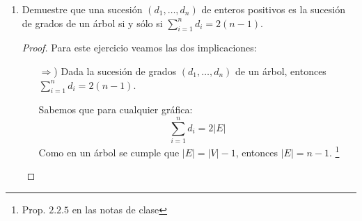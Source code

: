 \documentclass{article}
\begin{document}
\begin{enumerate}
      \begin{proof} Demostración por inducción sobre m

        Paso base (m=1)

        Por definición de hidrocarburo saturado $C_1 k_4 \Longrightarrow$  4 = 2(1)+2 por lo tanto para m=1 se cumple que n=2m+2

        Hipótesis de inducción m = k, si  $C_k H_n \Longrightarrow$ supongamos n=2k+2

        Paso Inductivo

        Pd m=k+1

        Por hipótesis de inducción tenemos que $C_k H_n \Longrightarrow$ n=2k+2 y por paso base $c_1 K_4 \Longrightarrow$ 4=2(1)+2 $\Longrightarrow$ sean r que pertenece a los Naturales sin el 0, sea $C_r$ y $C_1$ donde  $C_r$ pertenece a $C_k H_n$  y $C_1$ pertenece a $C_1 k_4$ tal que r pertenece a ${1,2,3,...,k}$  $\Longrightarrow$  eliminemos 1 hidrógeno a $C_r$ y $C_1 \Longrightarrow C_k H_{n-1}$ y $C_1 k_3$ son iguales a n-1=2k+1 ...(1) y 3=2(1)+1 ...(2) $\Longrightarrow$ uniendo $C_k H_{n-1}$ y $C_1 k_3$ mediante los vertices $C_r$ y $C_1$ $\Longrightarrow C_{k+1} H_{m}$ seria igual a la suma de (1) y (2) $\Longrightarrow$ n+2 = 2(k) + 2(1) +2 $\Longrightarrow$  n+2 = 2(k+1)+2
        $\Longrightarrow$ m=n+1 $\Longrightarrow$  n+2 = 2(k+1)+2. Por lo tanto para $C_{k+1} H_{m}$ m=2(k+1)+2

        Por lo tanto,  para todo m que pertenece a Naturales sin el cero $C_m H_n$ tal que n=2m+2


      \end{proof}

    \item Demuestre que una sucesi\'on $(d_1, \dots,
      d_n)$ de enteros positivos es la sucesi\'on de
      grados de un \'arbol si y s\'olo si
      $\sum_{i=1}^n d_i = 2(n-1)$.

      \renewcommand\qedsymbol{QED}
      \begin{proof}
        Para este ejercicio veamos las dos implicaciones:
        \begin{itemize}
          \item[$\Rightarrow$)] Dada la sucesi\'on de grados $(d_1, \dots, d_n)$ de un
            \'arbol, entonces $\displaystyle \sum_{i=1}^n d_i = 2(n-1)$.

            Sabemos que para cualquier gr\'afica:
            \[
            \sum_{i=1}^n d_i = 2|E|
            \]
            Como en un \'arbol se cumple que $|E| = |V| - 1$, entonces $|E| = n - 1$. \footnote{Prop. $2.2.5$ en las
            notas de clase}


\end{itemize}
\end{proof}
\end{enumerate}
\end{document}
